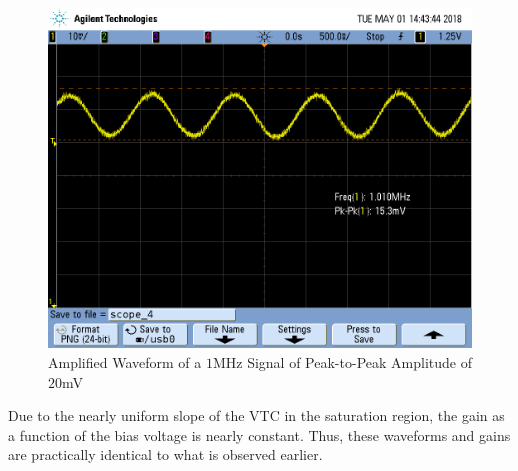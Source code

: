 \FloatBarrier

\begin{figure}[h!]
	\centering
	\includegraphics[scale=0.45]{./images/SCOPE_4.PNG}
	\caption{Amplified Waveform of a $1$\si{\mega\hertz} Signal of Peak-to-Peak Amplitude of $20$\si{\milli\volt}}
	\label{fig:SCOPE_4}
\end{figure}

\FloatBarrier

Due to the nearly uniform slope of the VTC in the saturation region, the gain as a function of the bias voltage is nearly constant.
Thus, these waveforms and gains are practically identical to what is observed earlier.

